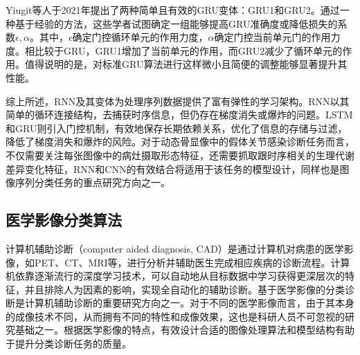 Yiugit等人\cite{yiugit2021simple}于2021年提出了两种简单且有效的GRU变体：GRU1和GRU2。通过一种基于经验的方法，这些学者试图确定一组能够提高GRU准确度或降低损失的系数\(\epsilon,\alpha\)。其中，\(\epsilon\)确定门控循环单元的作用力度，\(\alpha\)确定门控当前单元门的作用力度。相比较于GRU，GRU1增加了当前单元的作用，而GRU2减少了循环单元的作用。值得说明的是，对标准GRU算法进行这样微小且简便的调整能够显著提升其性能。

综上所述，RNN及其变体为处理序列数据提供了富有弹性的学习架构。RNN以其简单的循环连接结构，去捕获时序信息，但仍存在梯度消失或爆炸的问题。LSTM和GRU则引入门控机制，有效地保存长期依赖关系，优化了信息的存储与过滤，降低了梯度消失和爆炸的风险。对于动态骨显像中的假体关节感染诊断任务而言，不仅需要关注每张图像中的病灶摄取形态特征，还需要抓取跟时序相关的生理代谢差异变化特征，RNN和CNN的有效结合将适用于该任务的模型设计，同样也是图像序列分类任务的重点研究方向之一。

\subsection{医学影像分类算法}

计算机辅助诊断（computer aided diagnosis, CAD）是通过计算机对病患的医学影像，如PET、CT、MRI等，进行分析并辅助医生完成相应疾病的诊断流程。计算机依靠逐渐流行的深度学习技术，可以自动地从目标数据中学习获得更深层次的特征，并且排除人为因素的影响，实现全自动化的辅助诊断。基于医学影像的分类诊断是计算机辅助诊断的重要研究方向之一。对于不同的医学影像而言，由于其本身的成像技术不同，从而拥有不同的特性和成像效果，这也是科研人员不可忽视的研究基础之一。根据医学影像的特点，有效设计合适的图像处理算法和模型结构有助于提升分类诊断任务的质量。

